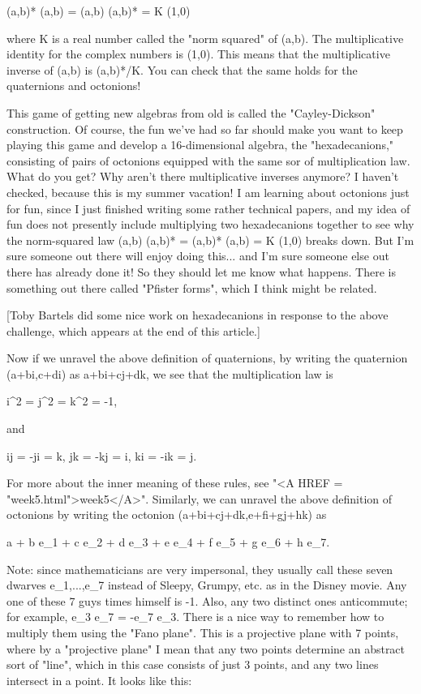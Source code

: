 (a,b)* (a,b) = (a,b) (a,b)* = K (1,0)

where K is a real number called the "norm squared" of (a,b).
The multiplicative identity for the complex numbers is (1,0).
This means that the multiplicative inverse of (a,b) is (a,b)*/K.  
You can check that the same holds for the quaternions and 
octonions!  

This game of getting new algebras from old is called the
"Cayley-Dickson" construction.  Of course, the fun we've had so 
far should make you want to keep playing this game and develop 
a 16-dimensional algebra, the "hexadecanions,"
consisting of pairs of octonions equipped with the same sor
of multiplication law.  What do you get?  Why aren't there
multiplicative inverses anymore?  I haven't checked, because
this is my summer vacation!  I am learning about octonions 
just for fun, since I just finished writing some rather technical papers, 
and my idea of fun does not presently include multiplying two 
hexadecanions together to see why the norm-squared law (a,b) (a,b)* =
(a,b)* (a,b) = K (1,0) breaks down.  But I'm sure someone out there 
will enjoy doing this... and I'm sure someone else out there has already 
done it!  So they should let me know what happens.  There is something
out there called "Pfister forms", which I think might be related.

[Toby Bartels did some nice work on hexadecanions in response to
the above challenge, which appears at the end of this article.]

Now if we unravel the above definition of quaternions, by writing
the quaternion (a+bi,c+di) as a+bi+cj+dk, we see that the multiplication
law is 

i^{2} = j^{2} = k^{2} = -1, 

and 

ij = -ji = k,     jk = -kj = i,     ki = -ik = j.

For more about the inner meaning of these rules, see "<A HREF = "week5.html">week5</A>".
Similarly, we can unravel the above definition of octonions by 
writing the octonion (a+bi+cj+dk,e+fi+gj+hk) as

a + b e_{1} + c e_{2} + d e_{3} + e e_{4} + f e_{5} + g e_{6} + h e_{7}.

Note: since mathematicians are very impersonal, they usually call
these seven dwarves e_{1},...,e_{7} instead of Sleepy,
Grumpy, etc. as in the Disney movie.  Any one of these 7 guys times
himself is -1.  Also, any two distinct ones anticommute; for example,
e_{3} e_{7} = -e_{7} e_{3}.  There is
a nice way to remember how to multiply them using the "Fano plane".
This is a projective plane with 7 points, where by a "projective
plane" I mean that any two points determine an abstract sort of
"line", which in this case consists of just 3 points, and any two
lines intersect in a point.  It looks like this:

